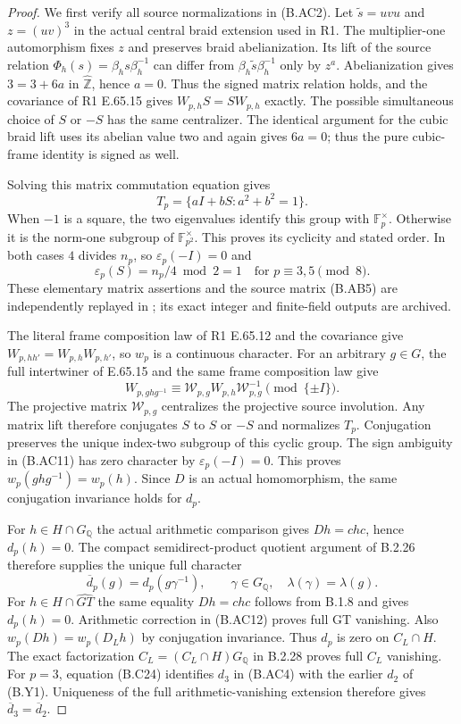 \begin{proof}
We first verify all source normalizations in (B.AC2).
Let $\widetilde s=uvu$ and $z=(uv)^3$ in the actual
central braid extension used in R1.  The multiplier-one
automorphism fixes $z$ and preserves braid abelianization.
Its lift of the source relation
$\Phi_h(s)=\beta_hs\beta_h^{-1}$ can differ from
$\beta_h\widetilde s\beta_h^{-1}$ only by $z^a$.
Abelianization gives $3=3+6a$ in $\widehat{\mathbb Z}$,
hence $a=0$.  Thus the signed matrix relation holds,
and the covariance of R1 E.65.15 gives
$W_{p,h}S=SW_{p,h}$ exactly.  The possible simultaneous
choice of $S$ or $-S$ has the same centralizer.
The identical argument for the cubic braid lift uses
its abelian value two and again gives $6a=0$;
thus the pure cubic-frame identity is signed as well.

Solving this matrix commutation equation gives
\[
 T_p=\{aI+bS:a^2+b^2=1\}.
 \tag{B.AC9}
\]
When $-1$ is a square, the two eigenvalues identify
this group with $\mathbb F_p^\times$.  Otherwise it
is the norm-one subgroup of $\mathbb F_{p^2}^\times$.
This proves its cyclicity and stated order.
In both cases $4$ divides $n_p$, so
$\varepsilon_p(-I)=0$ and
\[
 \varepsilon_p(S)=n_p/4\bmod2
 =1\quad\text{for }p\equiv3,5\pmod8.
 \tag{B.AC10}
\]
These elementary matrix assertions and the source
matrix (B.AB5) are independently replayed in
; its exact
integer and finite-field outputs are archived.

The literal frame composition law of R1 E.65.12
and the covariance give
$W_{p,hh'}=W_{p,h}W_{p,h'}$, so $w_p$ is a
continuous character.  For an arbitrary $g\in G$,
the full intertwiner of E.65.15 and the same
frame composition law give
\[
 W_{p,ghg^{-1}}
 \equiv \mathcal W_{p,g}W_{p,h}\mathcal W_{p,g}^{-1}
                           \pmod{\{\pm I\}}.
 \tag{B.AC11}
\]
The projective matrix $\mathcal W_{p,g}$ centralizes
the projective source involution.  Any matrix lift
therefore conjugates $S$ to $S$ or $-S$ and
normalizes $T_p$.  Conjugation preserves the unique
index-two subgroup of this cyclic group.
The sign ambiguity in (B.AC11) has zero character
by $\varepsilon_p(-I)=0$.  This proves
$w_p(ghg^{-1})=w_p(h)$.
Since $D$ is an actual homomorphism, the same
conjugation invariance holds for $d_p$.

For $h\in H\cap G_{\mathbb Q}$ the actual arithmetic
comparison gives $Dh=chc$, hence $d_p(h)=0$.
The compact semidirect-product quotient argument of
B.2.26 therefore supplies the unique full character
\[
 \overline d_p(g)=d_p(g\gamma^{-1}),\qquad
       \gamma\in G_{\mathbb Q},\quad
                          \lambda(\gamma)=\lambda(g).
 \tag{B.AC12}
\]
For $h\in H\cap\widehat{GT}$ the same equality
$Dh=chc$ follows from B.1.8 and gives $d_p(h)=0$.
Arithmetic correction in (B.AC12) proves full GT
vanishing.  Also
$w_p(Dh)=w_p(D_Lh)$ by conjugation invariance.
Thus $d_p$ is zero on $C_L\cap H$.
The exact factorization
$C_L=(C_L\cap H)G_{\mathbb Q}$ in B.2.28 proves
full $C_L$ vanishing.
For $p=3$, equation (B.C24) identifies $d_3$ in
(B.AC4) with the earlier $d_2$ of (B.Y1).
Uniqueness of the full arithmetic-vanishing extension
therefore gives $\overline d_3=\overline d_2$.


\end{proof}
